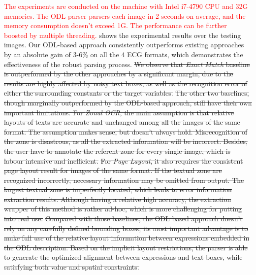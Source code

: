 \textcolor{red}{
The experiments are conducted on the machine with Intel i7-4790 CPU and 32G memories. The ODL parser parsers each image in 2 seconds on average,
and the memory consumption doesn't exceed 1G.
The performance can be further boosted by multiple threading.
}
 shows the experimental results over the testing images.
Our ODL-based approach consistently outperforms existing approaches by
an absolute gain of 3-6\% on all the 4 ECG formats,
which demonstrates the effectiveness of the robust parsing process.
\st{
We observe that \textit{Exact Match} baseline is outperformed by the other
approaches by a significant margin,
due to the results are highly affected by noisy text boxes,
as well as the recognition error of either the surrounding constants
or the target variables.
}
\st{
The other two baselines,
though marginally outperformed by the ODL-based approach,
still have their own important limitations.
For \textit{Zonal OCR}, the main assumption is that relative layouts of texts
are accurate and unchanged among all the images of the same format.
The assumption makes sense, but doesn't always hold.
Misrecognition of the zone is disastrous,
as all the extracted information will be incorrect.
Besides, the user have to annotate the referent zone for every single image,
which is labour intensive and inefficient.
}
\st{
For \textit{Page Layout},
it also requires the consistent page layout result for images of the same format.
If the textual zone are recognized incorrectly,
necessary information may be omitted from output.
The largest textual zone is imperfectly located,
which leads to error information extraction results.
Although having a relative high accuracy,
the extraction wrapper of this method is rather ad-hoc,
which is more challenging for putting into real use.
}
\st{
Compared with those baselines,
the ODL based approach doesn't rely on any carefully defined bounding boxes,
its most important advantage is to make full use of the relative layout
information between expressions embedded in the ODL description.
Based on the implicit layout restrictions,
the parser is able to generate the optimized alignment between
expressions and text boxes, while satisfying both value and spatial constraints.
}



